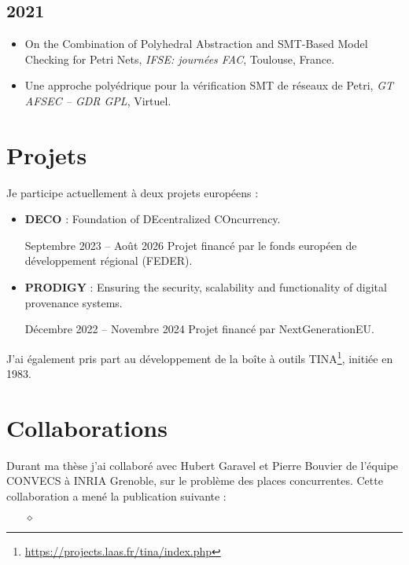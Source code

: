\vspace{5pt}
\subsection*{2021}

\vspace{5pt}
\begin{itemize}
  \item On the Combination of Polyhedral Abstraction and SMT-Based Model
  Checking for Petri Nets, \textit{IFSE: journées FAC}, Toulouse, France.

  \item Une approche polyédrique pour la vérification SMT de réseaux de Petri,
  \textit{GT AFSEC -- GDR GPL}, Virtuel.
\end{itemize}

\vspace{10pt}
\section{Projets}
\vspace{10pt}
Je participe actuellement à deux projets européens :

\begin{itemize}
  \item \textbf{DECO} : Foundation of DEcentralized COncurrency. 
  \begin{mdframed}
    Septembre 2023 -- Août 2026
    \smallbreak
    Projet financé
    par le fonds européen de développement régional (FEDER).
  \end{mdframed}
  \smallbreak
  \item \textbf{PRODIGY} : Ensuring the security, scalability and functionality of digital provenance systems.
  \begin{mdframed}
    Décembre 2022 -- Novembre 2024
    \smallbreak
    Projet financé par NextGenerationEU.
  \end{mdframed}
\end{itemize}
\smallbreak

J'ai également pris part au développement de la boîte à outils
TINA\footnote{\url{https://projects.laas.fr/tina/index.php}}, initiée en 1983.

\vspace{10pt}
\section{Collaborations}
\vspace{10pt}

Durant ma thèse j'ai collaboré avec Hubert Garavel et Pierre Bouvier de l'équipe
CONVECS à INRIA Grenoble, sur le problème des places concurrentes. Cette
collaboration a mené la publication suivante :

\begin{itemize}
  \item[$\diamond$] 
\end{itemize}


